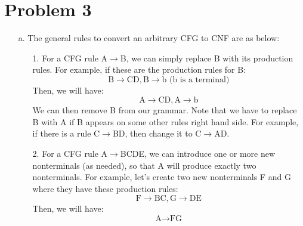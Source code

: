 \documentclass[twoside]{homework}
\begin{document}
\section*{Problem 3}
\begin{itemize}
    \item [a.] The general rules to convert an arbitrary CFG to CNF are as below:
    \begin{itemize}
        \item [1.] For a CFG rule A$\xrightarrow{}$B, we can simply replace B with its production rules. For example, if these are the production rules for B:
        $$\text{B}\xrightarrow{}\text{CD}, \text{B}\xrightarrow{}\text{b (b is a terminal)}$$
        Then, we will have:
        $$\text{A}\xrightarrow{}\text{CD}, \text{A}\xrightarrow{}\text{b}$$
        We can then remove B from our grammar. Note that we have to replace B with A if B appears on some other rules right hand side. For example, if there is a rule C$\xrightarrow{}$BD, then change it to C$\xrightarrow{}$AD.
        \item [2.] For a CFG rule A$\xrightarrow{}$BCDE, we can introduce one or more new nonterminals (as needed), so that A will produce exactly two nonterminals. For example, let's create two new nonterminals F and G where they have these production rules:
        $$\text{F}\xrightarrow{}\text{BC}, \text{G}\xrightarrow{}\text{DE}$$
        Then, we will have:
        $$\text{A}\xrightarrow{}\text{FG}$$


\end{itemize}
\end{itemize}
\end{document}
